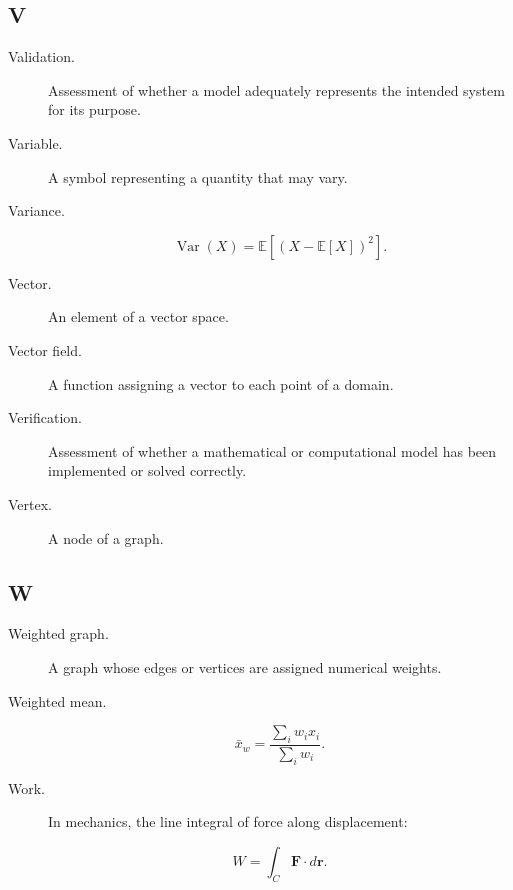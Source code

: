 \subsection*{V}

\begin{description}

\item[Validation.]
Assessment of whether a model adequately represents the intended system for
its purpose.

\item[Variable.]
A symbol representing a quantity that may vary.

\item[Variance.]

\[
\operatorname{Var}(X)
=
\mathbb{E}
[
(X-\mathbb{E}[X])^2
].
\]

\item[Vector.]
An element of a vector space.

\item[Vector field.]
A function assigning a vector to each point of a domain.

\item[Verification.]
Assessment of whether a mathematical or computational model has been
implemented or solved correctly.

\item[Vertex.]
A node of a graph.

\end{description}

\subsection*{W}

\begin{description}

\item[Weighted graph.]
A graph whose edges or vertices are assigned numerical weights.

\item[Weighted mean.]

\[
\bar{x}_w
=
\frac{
\sum_i w_ix_i
}{
\sum_iw_i
}.
\]

\item[Work.]
In mechanics, the line integral of force along displacement:

\[
W
=
\int_C
\mathbf{F}\cdot d\mathbf{r}.
\]

\end{description}

